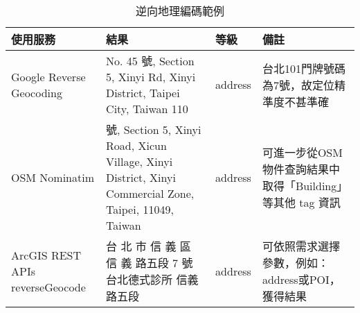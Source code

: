 \begin{table}[htbp]
\centering
\caption{逆向地理編碼範例}
\label{tab:reverseGeocodingAPI}
\begin{adjustbox}{max width=\textwidth}
\renewcommand{\arraystretch}{1.4}
\begin{tabular}{>{\centering\arraybackslash}m{3cm} >{\centering\arraybackslash}m{7.5cm} >{\centering\arraybackslash}m{2.5cm} >{\centering\arraybackslash}m{5cm}}
\toprule 
使用服務 & 結果 & 等級 & 備註 \\
\toprule
Google Reverse Geocoding & No. 45 號, Section 5, Xinyi Rd, Xinyi District, Taipei City, Taiwan 110 & address & 台北101門牌號碼為7號，故定位精準度不甚準確 \\
\hline
OSM Nominatim & 7 號, Section 5, Xinyi Road, Xicun Village, Xinyi District, Xinyi Commercial Zone, Taipei, 11049, Taiwan & address & 可進一步從OSM物件查詢結果中取得「Building」等其他 tag 資訊 \\
\hline
ArcGIS REST APIs reverseGeocode & 台 北 市 信 義 區 信 義 路五段 7 號 台北德式診所 信義路五段 & address & 可依照需求選擇參數，例如：address或POI，獲得結果 \\
\bottomrule 
\end{tabular}
\end{adjustbox}
\end{table}